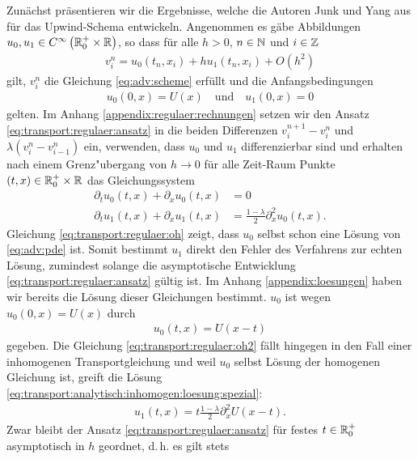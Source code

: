 
Zunächst präsentieren wir die Ergebnisse, welche die Autoren Junk und Yang aus \cite{Junk2004} für das Upwind-Schema entwickeln.
Angenommen es gäbe Abbildungen $u_0, u_1 \in C^\infty\left( \mathbb R^+_0 \times \mathbb R \right)$, so dass für alle $h > 0$, $n \in \mathbb N$ und $i \in \mathbb Z$
\begin{align}\label{eq:transport:regulaer:ansatz}
v^n_i = u_0(t_n,x_i) + h u_1(t_n,x_i) + O(h^2)
\end{align}
gilt, $v^n_i$ die Gleichung \eqref{eq:adv:scheme} erfüllt und die Anfangsbedingungen
\begin{align}\label{eq:transport:regulaer:anfangsbedingungen}
u_0(0,x) = U(x) \quad \text{und} \quad u_1(0, x) = 0
\end{align}
gelten.
Im Anhang \ref{appendix:regulaer:rechnungen} setzen wir den Ansatz \eqref{eq:transport:regulaer:ansatz} in die beiden Differenzen $v^{n+1}_i - v^n_i$ und $\lambda ( v^n_i - v^n_{i-1} )$ ein, verwenden, dass $u_0$ und $u_1$ differenzierbar sind und erhalten nach einem Grenz"ubergang von $h \to 0$ für alle Zeit-Raum Punkte $(t,x) \in \mathbb R^+_0 \times \mathbb R$ das Gleichungssystem 
\begin{align}
\label{eq:transport:regulaer:oh}
\partial_t u_0(t,x) + \partial_x u_0(t,x) &= 0\\
\label{eq:transport:regulaer:oh2}
\partial_t u_1(t,x) + \partial_x u_1(t,x) &= \frac{1-\lambda}{2} \partial^2_x u_0(t,x).
\end{align}
Gleichung \eqref{eq:transport:regulaer:oh} zeigt, dass $u_0$ selbst schon eine Lösung von \eqref{eq:adv:pde} ist.
Somit bestimmt $u_1$ direkt den Fehler des Verfahrens zur echten Lösung, zumindest solange die asymptotische Entwicklung \eqref{eq:transport:regulaer:ansatz} gültig ist.
Im Anhang \ref{appendix:loesungen} haben wir bereits die Lösung dieser Gleichungen bestimmt.
$u_0$ ist wegen $u_0(0,x) = U(x)$ durch
\begin{align*}
u_0(t,x) = U(x-t)
\end{align*}
gegeben.
Die Gleichung \eqref{eq:transport:regulaer:oh2} fällt hingegen in den Fall einer inhomogenen Transportgleichung und weil $u_0$ selbst Lösung der homogenen Gleichung ist, greift die Lösung \eqref{eq:transport:analytisch:inhomogen:loesung:spezial}:
\begin{align*}
u_1(t,x) = t \frac{1-\lambda}{2} \partial^2_x U(x-t).
\end{align*}
Zwar bleibt der Ansatz \eqref{eq:transport:regulaer:ansatz} für festes $t \in \mathbb R^+_0$ asymptotisch in $h$ geordnet, d.\,h. es gilt stets
